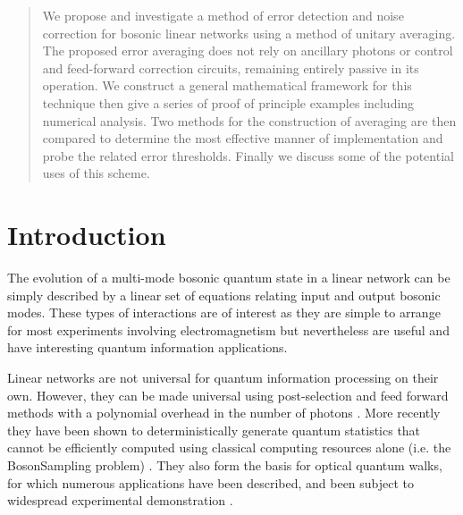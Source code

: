 \documentclass[aps,pra,twocolumn,superscriptaddress,numerical,floatfix]{revtex4-1}
\begin{document}
\begin{abstract}
We propose and investigate a method of error detection and noise correction for bosonic linear networks using a method of unitary averaging. The proposed error averaging does not rely on ancillary photons or control and feed-forward correction circuits, remaining entirely passive in its operation.  We construct a general mathematical framework for this technique then give a series of proof of principle examples including numerical analysis. Two methods for the construction of averaging are then compared to determine the most effective manner of implementation and probe the related error thresholds.  Finally we discuss some of the potential uses of this scheme. 
\end{abstract}

\pacs{}

\maketitle

\section{Introduction \label{intro}}

The evolution of a multi-mode bosonic quantum state in a linear network can be simply described by a linear set of equations relating input and output bosonic modes.  These types of interactions are of interest as they are simple to arrange for most experiments involving electromagnetism but nevertheless are useful and have interesting quantum information applications.  

Linear networks are not universal for quantum information processing on their own.  However, they can be made universal using post-selection and feed forward methods with a polynomial overhead in the number of photons \cite{KLM,one-way_quantum_computer,OQC}. More recently they have been shown to deterministically generate quantum statistics that cannot be efficiently computed using classical computing resources alone (i.e.  the BosonSampling problem) \cite{Boson}. They also form the basis for optical quantum walks, for which numerous applications have been described, and been subject to widespread experimental demonstration \cite{bib:aharonov1993quantum,bib:Broome10,bib:PeruzzoQW,bib:RohdeQWExp12,bib:Schreiber10}.
\end{document}
